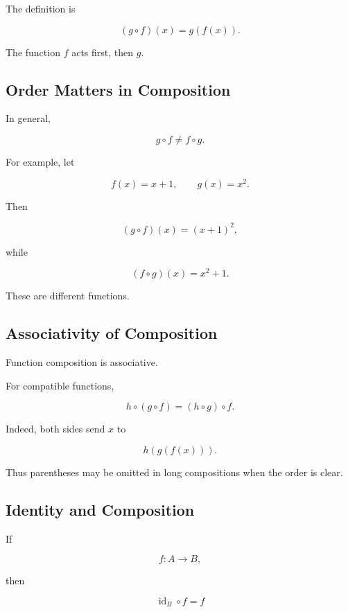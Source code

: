 The definition is

\[ (g\circ f)(x)=g(f(x)). \]

The function \(f\) acts first, then \(g\).

\subsection{Order Matters in Composition}
\label{subsec:composition-order}

In general,

\[ g\circ f\neq f\circ g. \]

For example, let

\[ f(x)=x+1,\qquad g(x)=x^2. \]

Then

\[ (g\circ f)(x)=(x+1)^2, \]

while

\[ (f\circ g)(x)=x^2+1. \]

These are different functions.

\subsection{Associativity of Composition}
\label{subsec:composition-associativity}

Function composition is associative.

For compatible functions,

\[ h\circ(g\circ f)=(h\circ g)\circ f. \]

Indeed, both sides send \(x\) to

\[ h(g(f(x))). \]

Thus parentheses may be omitted in long compositions when the order is clear.

\subsection{Identity and Composition}
\label{subsec:identity-composition}

If

\[ f:A\to B, \]

then

\[ \operatorname{id}_B\circ f=f \]

